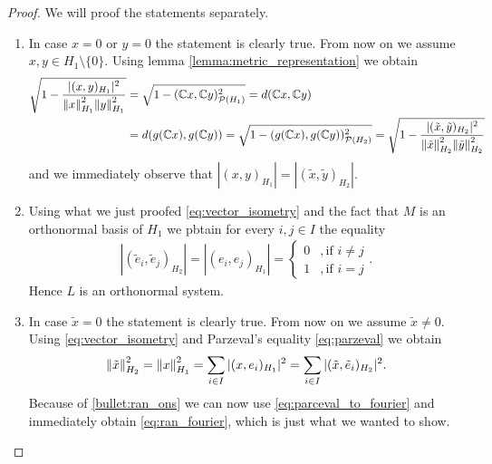 \begin{proof}
	We will proof the statements separately.
	\begin{enumerate}
		\item In case $x = 0$ or $y = 0$ the statement is clearly true. From now on we assume $x,y \in H_1 \setminus \{0\}$. Using lemma \ref{lemma:metric_representation} we obtain
		\begin{align*}
			\sqrt{1 - \dfrac{|(x,y)_{H_1}|^2}{\norm[H_1]{x}^2 \norm[H_1]{y}^2}} &= \sqrt{1 - (\C x,\C y)_{\mathcal{P}(H_1)}^2} = d(\C x,\C y) \\
			&= d\pbraces{g(\C x), g(\C y)} = \sqrt{1 - (g(\C x), g(\C y))_{\mathcal{P}(H_2)}^2} = \sqrt{1 - \dfrac{|(\tilde{x}, \tilde{y})_{H_2}|^2}{\norm[H_2]{\tilde{x}}^2 \norm[H_2]{\tilde{y}}^2}}
		\end{align*}
		and we immediately observe that $|(x,y)_{H_1}| = |(\tilde{x},\tilde{y})_{H_2}|$. 
		
		\item Using what we just proofed \eqref{eq:vector_isometry} and the fact that $M$ is an orthonormal basis of $H_1$ we pbtain for every $i,j \in I$ the equality
		\begin{align*}
			|(\tilde{e}_i, \tilde{e}_j)_{H_2}| = |(e_i, e_j)_{H_1}| = 
			\begin{cases}
				0 &, \text{if } i \neq j \\
				1 &, \text{if } i = j
			\end{cases}.
		\end{align*}
		Hence $L$ is an orthonormal system.
		
		\item In case $\tilde{x} = 0$ the statement is clearly true. From now on we assume $\tilde{x} \neq 0$. Using \eqref{eq:vector_isometry} and Parzeval's equality \eqref{eq:parzeval} we obtain
		\begin{align*}
			\norm[H_2]{\tilde{x}}^2 = \norm[H_1]{x}^2 = \sum_{i \in I} |(x, e_i)_{H_1}|^2 = \sum_{i \in I} |(\tilde{x}, \tilde{e}_i)_{H_2}|^2.
		\end{align*}
		Because of \ref{bullet:ran_ons} we can now use \eqref{eq:parceval_to_fourier} and immediately obtain \eqref{eq:ran_fourier}, which is just what we wanted to show.
	\end{enumerate}
\end{proof}